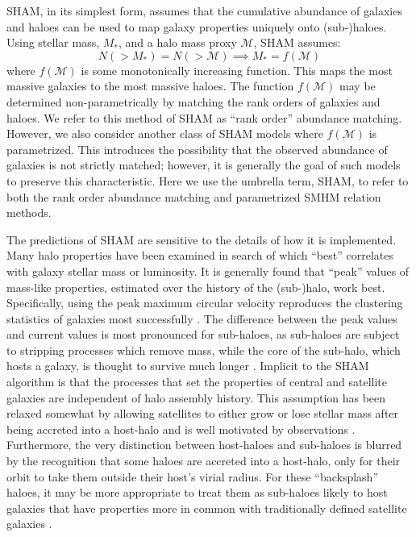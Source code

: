\documentclass[useAMS,fleqn,usenatbib]{mnras}
\begin{document}
SHAM, in its simplest form, assumes that the cumulative abundance of galaxies and haloes can be used to map galaxy properties uniquely onto (sub-)haloes.  Using stellar mass, $M_{*}$, and a halo mass proxy $\mathcal{M}$, SHAM assumes:
%
\begin{equation}
\label{eq:sham}
N(>M_*) = N(>\mathcal{M}) \implies M_{*} = f(\mathcal{M})
\end{equation} 
%
where $f(\mathcal{M})$ is some monotonically increasing function.  This maps the most massive galaxies to the most massive haloes.  The function $f(\mathcal{M})$ may be determined non-parametrically by matching the rank orders of galaxies and haloes.  We refer to this method of SHAM as ``rank order'' abundance matching.  However, we also consider another class of SHAM models where $f(\mathcal{M})$ is parametrized.  This introduces the possibility that the observed abundance of galaxies is not strictly matched; however, it is generally the goal of such models to preserve this characteristic. Here we use the umbrella term, SHAM, to refer to both the rank order abundance matching and parametrized SMHM relation methods.

The predictions of SHAM are sensitive to the details of how it is implemented.  Many halo properties have been examined in search of which ``best'' correlates with galaxy stellar mass or luminosity.  It is generally found that ``peak'' values of mass-like properties, estimated over the history of the (sub-)halo, work best.  Specifically, using the peak maximum circular velocity reproduces the clustering statistics of galaxies most successfully \citep{Conroy:2006iz, Reddick:2013gi}.  The difference between the peak values and current values is most pronounced for sub-haloes, as sub-haloes are subject to stripping processes which remove mass, while the core of the sub-halo, which hosts a galaxy, is thought to survive much longer \citep[e.g.][and references therein]{Behroozi:2014bg, vandenBosch:2016cj, Jiang:2016dw, vandenBosch:2016ky}.  Implicit to the SHAM algorithm is that the processes that set the properties of central and satellite galaxies are independent of halo assembly history.  This assumption has been relaxed somewhat by allowing satellites to either grow or lose stellar mass after being accreted into a host-halo \citep{Watson:2012hw, Yang:2012ew,  Behroozi:2015wx} and is well motivated by observations \citep{Wetzel:2013dw}.  Furthermore, the very distinction between host-haloes and sub-haloes is blurred by the recognition that some haloes are accreted into a host-halo, only for their orbit to take them outside their host's virial radius.  For these ``backsplash'' haloes, it may be more appropriate to treat them as sub-haloes likely to host galaxies that have properties more in common with traditionally defined satellite galaxies \citep{Mamon:2004jy, Wetzel:2014up}.
\end{document}
